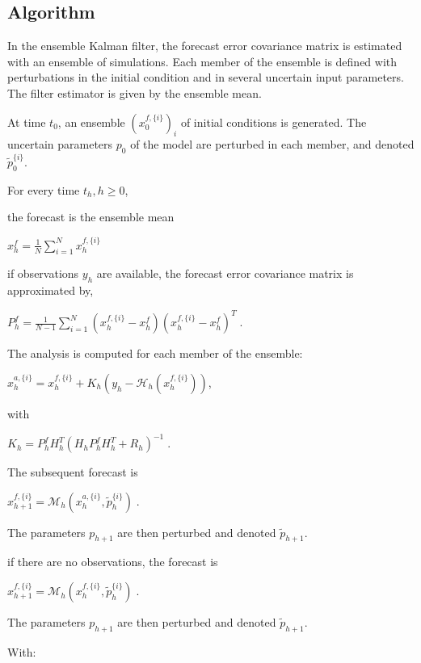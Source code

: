 \documentclass{tufte-book}
\begin{document}
\hypertarget{ensemble_kalman_filter_algorithm_enkf}{}\subsection{\-Algorithm}\label{ensemble_kalman_filter_algorithm_enkf}
\-In the ensemble \-Kalman filter, the forecast error covariance matrix is estimated with an ensemble of simulations. \-Each member of the ensemble is defined with perturbations in the initial condition and in several uncertain input parameters. \-The filter estimator is given by the ensemble mean.


\begin{DoxyEnumerate}
\item \-At time $t_0$, an ensemble $(x^{f, \{i\} }_{0})_i$ of initial conditions is generated. \-The uncertain parameters $p_0$ of the model are perturbed in each member, and denoted $\widetilde p_0^{\{i\}}$.
\item \-For every time $t_h, h \ge 0$,
\begin{DoxyItemize}
\item the forecast is the ensemble mean \par
 $x_{h}^f = \frac{1}{N} \displaystyle\sum\limits_{i=1}^{N} x^{f, \{i\} }_{h}$
\item if observations $y_h$ are available, the forecast error covariance matrix is approximated by, \par
 $P_h^{f} = \frac{1}{N-1} \displaystyle\sum\limits_{i=1}^{N} (x_{h}^{f, \{i\}} - x_{h}^f)(x_{h}^{f, \{i\}} - x_{h}^f)^T\;.$ \par
 \-The analysis is computed for each member of the ensemble\-: \par
 $x_h^{a, \{i\}} = x_h^{f, \{i\}} + K_h(y_h - \mathcal{H}_h(x_h^{f, \{i\}}))$, \par
 with \par
 $K_h = P_h^{f}H_h^{T}(H_hP_h^{f}H_h^{T} + R_h)^{-1}\;.$ \par
 \-The subsequent forecast is \par
 $x_{h+1}^{f,\{i\}} = \mathcal{M}_h(x_h^{a ,\{i\}}, \widetilde p_h^{\{i\}})\;.$ \par
 \-The parameters $p_{h+1}$ are then perturbed and denoted $\widetilde p_{h+1}$.
\item if there are no observations, the forecast is \par
 $x_{h+1}^{f,\{i\}} = \mathcal{M}_h(x_h^{f ,\{i\}}, \widetilde p_h^{\{i\}})\;.$ \par
 \-The parameters $p_{h+1}$ are then perturbed and denoted $\widetilde p_{h+1}$.
\end{DoxyItemize}
\end{DoxyEnumerate}\-With\-: \par
\end{document}
